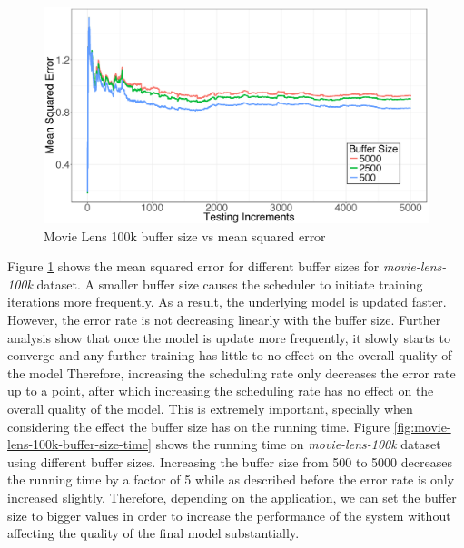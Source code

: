 \documentclass{vldb}
\begin{document}
\begin{figure}[H]
\centering
\includegraphics[width=\columnwidth]{../images/experiment-results/movie-lens-buffer-quality-improved.eps}
\caption{Movie Lens 100k buffer size vs mean squared error}
\label{fig:movie-lens-100k-buffer-size-mse}
\end{figure}

Figure \ref{fig:movie-lens-100k-buffer-size-mse} shows the mean squared error for different buffer sizes for \textit{movie-lens-100k} dataset. 
A smaller buffer size causes the scheduler to initiate training iterations more frequently.
As a result, the underlying model is updated faster.
However, the error rate is not decreasing linearly with the buffer size.
Further analysis show that once the model is update more frequently, it slowly starts to converge and any further training has little to no effect on the overall quality of the model
Therefore, increasing the scheduling rate only decreases the error rate up to a point, after which increasing the scheduling rate has no effect on the overall quality of the model.
This is extremely important, specially when considering the effect the buffer size has on the running time.
Figure \ref{fig:movie-lens-100k-buffer-size-time} shows the running time on \textit{movie-lens-100k} dataset using different buffer sizes. 
Increasing the buffer size from 500 to 5000 decreases the running time by a factor of 5 while as described before the error rate is only increased slightly.
Therefore, depending on the application, we can set the buffer size to bigger values in order to increase the performance of the system without affecting the quality of the final model substantially.
\end{document}
